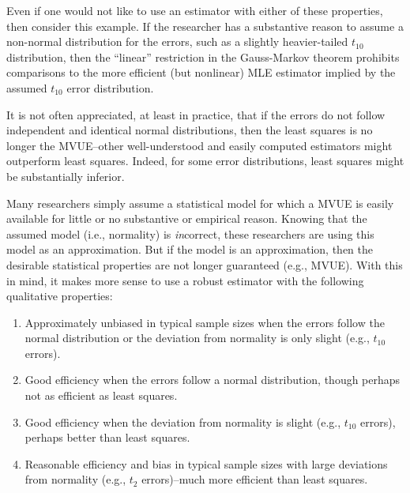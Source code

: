 \documentclass[12pt]{article}
\begin{document}
Even if one would not like to use an estimator with either of these properties, then consider this example. If the researcher has a substantive reason to assume a non-normal distribution for the errors, such as a slightly heavier-tailed $t_{10}$ distribution, then the ``linear'' restriction in the Gauss-Markov theorem prohibits comparisons to the more efficient (but nonlinear) MLE estimator implied by the assumed $t_{10}$ error distribution.

It is not often appreciated, at least in practice, that if the errors do not follow independent and identical normal distributions, then the least squares is no longer the MVUE--other well-understood and easily computed estimators might outperform least squares. Indeed, for some error distributions, least squares might be substantially inferior.

Many researchers simply assume a statistical model for which a MVUE is easily available for little or no substantive or empirical reason. Knowing that the assumed model (i.e., normality) is \textit{in}correct, these researchers are using this model as an approximation. But if the model is an approximation, then the desirable statistical properties are not longer guaranteed (e.g., MVUE). With this in mind, it makes more sense to use a robust estimator with the following qualitative properties:
\begin{enumerate}
\item Approximately unbiased in typical sample sizes when the errors follow the normal distribution or the deviation from normality is only slight (e.g., $t_10$ errors).
\item Good efficiency when the errors follow a normal distribution, though perhaps not as efficient as least squares.
\item Good efficiency when the deviation from normality is slight (e.g., $t_10$ errors), perhaps better than least squares.
\item Reasonable efficiency and bias in typical sample sizes with large deviations from normality (e.g., $t_2$ errors)--much more efficient than least squares.
\end{enumerate}

\end{document}
